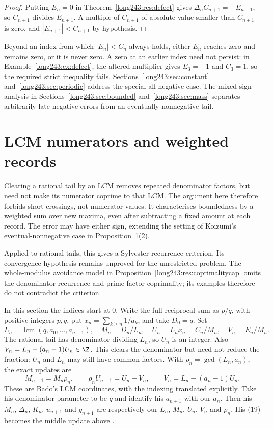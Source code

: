 \begin{proof}
Putting $E_n=0$ in Theorem~\ref{long243:res:defect} gives
$\Delta_n C_{n+1}=-E_{n+1}$, so $C_{n+1}$ divides $E_{n+1}$.  A multiple of
$C_{n+1}$ of absolute value smaller than $C_{n+1}$ is zero, and
$|E_{n+1}|<C_{n+1}$ by hypothesis.
\end{proof}

Beyond an index from which $|E_n|<C_n$ always holds, either $E_n$
reaches zero and remains zero, or it is never zero. A zero at an earlier
index need not persist: in Example~\ref{long243:ex:defect}, the altered
multiplier gives $E_3=-1$ and $C_3=1$, so the required strict inequality
fails.
Sections~\ref{long243:sec:constant} and~\ref{long243:sec:periodic} address
the special all-negative case. The mixed-sign analysis in
Sections~\ref{long243:sec:bounded} and~\ref{long243:sec:mass} separates
arbitrarily late negative errors from an eventually nonnegative tail.

\section{LCM numerators and weighted records}\label{long243:sec:lcmrecords}

Clearing a rational tail by an LCM removes repeated denominator
factors, but need not make its numerator coprime to that LCM. The
argument here therefore forbids short crossings, not numerator values.
It characterises boundedness by a weighted sum over new maxima, even
after subtracting a fixed amount at each record. The error may have
either sign, extending the setting of Koizumi's eventual-nonnegative
case in Proposition~1(2).

Applied to rational tails, this gives a Sylvester recurrence criterion.
Its convergence hypothesis remains unproved for the unrestricted
problem. The whole-modulus avoidance model in
Proposition~\ref{long243:res:coprimalitycap} omits the denominator
recurrence and prime-factor coprimality; its examples therefore do not
contradict the criterion.

In this section the indices start at $0$. Write the full reciprocal
sum as $p/q$, with positive integers $p,q$, put $x_n=\sum_{k\ge n}1/a_k$, and take
$D_0=q$. Set
\[
 L_n=\operatorname{lcm}(q,a_0,\ldots,a_{n-1}),\quad
 M_n=D_n/L_n,\quad U_n=L_nx_n=C_n/M_n,\quad V_n=E_n/M_n.
\]
The rational tail has denominator dividing $L_n$, so $U_n$ is an integer.
Also $V_n=L_n-(a_n-1)U_n\in\Z$. This clears the denominator but need
not reduce the fraction: $U_n$ and $L_n$ may still have common factors.
With $\rho_n=\gcd(L_n,a_n)$, the exact updates are
\[
 M_{n+1}=M_n\rho_n,\qquad
 \rho_nU_{n+1}=U_n-V_n,\qquad V_n=L_n-(a_n-1)U_n.
\]
These are Bado's LCM coordinates, with the indexing translated explicitly.
Take his denominator parameter to be $q$ and identify his $a_{n+1}$
with our $a_n$. Then his $M_n$, $\Delta_n$, $K_n$, $u_{n+1}$ and
$g_{n+1}$ are respectively our $L_n$, $M_n$, $U_n$, $V_n$ and $\rho_n$.
His (19) becomes the middle update above
\cite[Prop.~7.1 and (16)--(20), pp.~6--7]{bado2026}.

